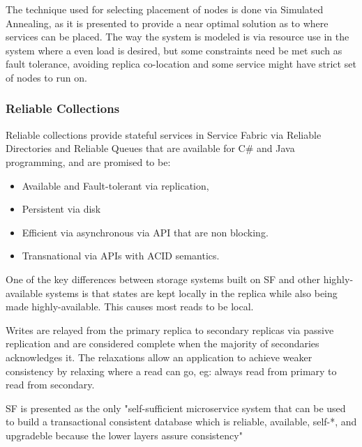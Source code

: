 \documentclass[a4paper,10pt,titlepage]{report}
\begin{document}
    The technique used for selecting placement of nodes is done via Simulated Annealing, as it is presented to provide a near optimal solution as to where services can be placed. The way the system is modeled is via resource use in the system where a even load is desired, but some constraints need be met such as fault tolerance, avoiding replica co-location and some service might have strict set of nodes to run on. \\
    \vspace{5mm}

    \subsubsection{Reliable Collections}

    Reliable collections provide stateful services in Service Fabric via Reliable Directories and Reliable Queues that are available for C\# and Java programming, and are promised to be:
    \begin{itemize}
        \item Available and Fault-tolerant via replication,
        \item Persistent via disk
        \item Efficient via asynchronous via API that are non blocking.
        \item Transnational via APIs with ACID semantics.
    \end{itemize}

    One of the key differences between storage systems built on SF and other highly-available systems is that states are kept locally in the replica while also being made highly-available. This causes most reads to be local.\\
    \vspace{5mm}

    Writes are relayed from the primary replica to secondary replicas via passive replication and are considered complete when the majority of secondaries acknowledges it. The relaxations allow an application to achieve weaker consistency by relaxing where a read can go, eg: always read from primary to read from secondary. \\
    \vspace{5mm}

    SF is presented as the only "self-sufficient microservice system that can be used to build a transactional consistent database which is reliable, available, self-*, and upgradeble because the lower layers assure consistency"\cite{SFpaper} \\
    \vspace{5mm}
\end{document}
